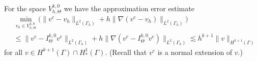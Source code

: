 \documentclass[final]{siamltex}
\begin{document}
\ \\[1ex]
\begin{lemma} \label{intertrace} For the space ${V_{h,\Theta}^{k,0}}$ we have the approximation error estimate
\begin{equation}
 \begin{split} 
 & \min_{v_h \in {V_{h,\Theta}^{k,0}}} \big( \|v^e-v_h\|_{L^2(\Gamma_h)} + h \|\nabla(v^e-v_h)\|_{L^2(\Gamma_h)} \big) \\
 & \leq \|v^e-{I_{\Theta}^{k,0}} v^e \|_{L^2(\Gamma_h)} + h \|\nabla(v^e- {I_{\Theta}^{k,0}} v^e)\|_{L^2(\Gamma_h)} 
 \lesssim h^{k+1} \|v\|_{H^{k+1}(\Gamma)} 
\end{split}
\end{equation}
for all $v \in H^{k+1}(\Gamma) \cap H^1_\ast(\Gamma)$. (Recall that $v^e$ is a normal extension of $v$.)
\end{lemma}
\end{document}
